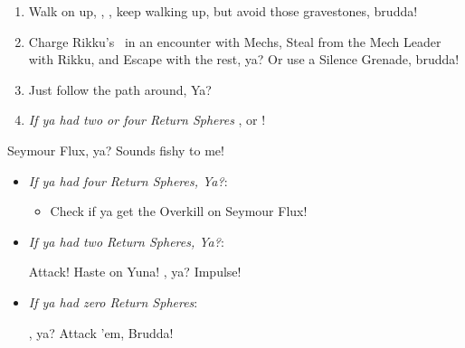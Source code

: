 \begin{enumerate}[resume]
\item Walk on up, \sd, \cs[1:20], keep walking up, but avoid those gravestones, brudda!
\item Charge Rikku's \od\ in an encounter with Mechs, Steal from the Mech Leader with Rikku, and Escape with the rest, ya? Or use a Silence Grenade, brudda!
\item Just follow the path around, Ya?
\item \textit{If ya had two or four Return Spheres} \formation{\tidus}{\yuna}{\auron}, or \formation{\tidus}{\kimahri}{\wakka}!
\end{enumerate}
\begin{battle}[70000]{Seymour Flux, ya? Sounds fishy to me!}
\begin{itemize}
\item \textit{If ya had four Return Spheres, Ya?}:
\begin{itemize}
\yunaf Attack!
\tidusf Haste on Yuna, brudda!
\switch{\auron}{\rikku}
\rikkuf Use Overdrive, with an HP Sphere and a Grenade, or a Silence Grenade, Ya?
\summon{\bahamut}, ya!
\bahamutf \textit{If ya used a Silence Grenade} Impulse, or just Attack, Brudda!
\yunaf Attack 'em, Ya?
\tidusf \textit{If you used a Silence Grenade} Attack once, or just Defend, ya?
\rikkuf Defend!
\item Check if ya get the Overkill on Seymour Flux!
\end{itemize}
\item \textit{If ya had two Return Spheres, Ya?}:
\begin{itemize}
\yunaf Attack!
\tidusf Haste on Yuna!
\summon{\bahamut}, ya?
\bahamutf Impulse!
\end{itemize}
\item \textit{If ya had zero Return Spheres}:
\begin{itemize}
\switch{\tidus}{\yuna}
\summon{\bahamut}, ya?
\bahamutf Attack 'em, Brudda!
\end{itemize}
\end{itemize}
\end{battle}
